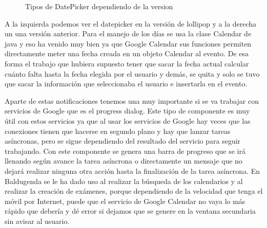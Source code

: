 \begin{figure}[H]
 \centering
 \caption{Tipos de DatePicker dependiendo de la version}
 \label{f:Tipos de DatePicker dependiendo de la version}
\end{figure}

A la izquierda podemos ver el datepicker en la versión de lollipop y a la derecha un una versión anterior.
Para el manejo de los días se usa la clase Calendar de java y eso ha venido muy bien ya que Google Calendar sus funciones permiten directamente meter una fecha creada en un objeto Calendar al evento.
De esa forma el trabajo que hubiera supuesto tener que sacar la fecha actual calcular cuánto falta hasta la fecha elegida por el usuario y demás, se quita y solo se tuvo que sacar la información que seleccionaba el usuario e insertarla en el evento.

Aparte de estas notificaciones tenemos  una muy importante si se va trabajar con servicios de Google que es el progress dialog.
Este tipo de componente es muy útil con estos servicios ya que al usar los servicios de Google hay veces que las conexiones tienen que hacerse en segundo plano y hay que lanzar tareas asíncronas, pero se sigue dependiendo del resultado del servicio para seguir trabajando.
Con este componente se genera una barra de progreso que se irá llenando según avance la tarea asíncrona o directamente un mensaje que no dejará realizar ninguna otra acción hasta la finalización de la tarea asíncrona.
En Baldugenda se le ha dado uso al realizar la búsqueda de los calendarios y al realizar la creación de exámenes, porque dependiendo de la velocidad que tenga el móvil por Internet, puede que el servicio de Google Calendar no vaya lo más rápido que debería y dé error si dejamos que se genere en la ventana secundaria sin avisar al usuario. 

